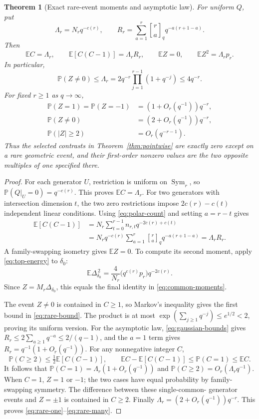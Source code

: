 \documentclass[11pt,a4paper]{article}
\newtheorem{theorem}{Theorem}[section]
\theoremstyle{definition}
\theoremstyle{remark}
\newcommand{\E}{\mathbb E}
\newcommand{\Pp}{\mathbb P}
\newcommand{\Sym}{\operatorname{Sym}}
\newcommand{\gb}[2]{\genfrac{[}{]}{0pt}{}{#1}{#2}_{q}}
\begin{document}
\begin{theorem}[Exact rare-event moments and asymptotic law]
\label{thm:rare-law}
For uniform $Q$, put
\begin{equation}\label{eq:lambda-R}
 \Lambda_r=N_rq^{-c(r)},\qquad
 R_r=\sum_{a=1}^r\gb ra q^{-a(r+1-a)}.
\end{equation}
Then
\begin{equation}\label{eq:common-moments}
 \E C=\Lambda_r,\qquad
 \E[C(C-1)]=\Lambda_r R_r,\qquad
 \E Z=0,\qquad \E Z^2=\Lambda_r p_r.
\end{equation}
In particular,
\begin{equation}\label{eq:rare-bound}
 \Pp(Z\ne0)\le\Lambda_r
 =2q^{-r}\prod_{j=1}^{r-1}(1+q^{-j})\le4q^{-r}.
\end{equation}
For fixed $r\ge1$ as $q\to\infty$,
\begin{align}
 \Pp(Z=1)=\Pp(Z=-1)&=(1+O_r(q^{-1}))q^{-r},
 \label{eq:rare-one}\\
 \Pp(Z\ne0)&=(2+O_r(q^{-1}))q^{-r},
 \label{eq:rare-nonzero}\\
 \Pp(|Z|\ge2)&=O_r(q^{-r-1}).\label{eq:rare-many}
\end{align}
Thus the selected contrasts in Theorem~\ref{thm:pointwise} are exactly
zero except on a rare geometric event, and their first-order nonzero
values are the two opposite multiples of one specified there.
\end{theorem}
\begin{proof}
For each generator $U$, restriction is uniform on $\Sym_r$, so
$\Pp(Q|_U=0)=q^{-c(r)}$. This proves $\E C=\Lambda_r$.
For two generators with intersection dimension $t$, the two zero
restrictions impose $2c(r)-c(t)$ independent linear conditions.
Using \eqref{eq:polar-count} and setting $a=r-t$ gives
\begin{align*}
 \E[C(C-1)]
 &=N_r\sum_{t=0}^{r-1}n_{r,t}q^{-2c(r)+c(t)}\\
 &=N_rq^{-c(r)}\sum_{a=1}^r\gb ra q^{-a(r+1-a)}
 =\Lambda_r R_r.
\end{align*}
A family-swapping isometry gives $\E Z=0$. To compute its second
moment, apply \eqref{eq:top-energy} to $\delta_0$:
\[
 \E\Delta_{\delta_0}^{\,2}
 =\frac4{N_r}\bigl(q^{c(r)}p_r\bigr)q^{-2c(r)}.
\]
Since $Z=M_r\Delta_{\delta_0}$, this equals the final identity in
\eqref{eq:common-moments}.

The event $Z\ne0$ is contained in $C\ge1$, so Markov's inequality gives
the first bound in \eqref{eq:rare-bound}.
The product is at most
$\exp(\sum_{j\ge1}q^{-j})\le e^{1/2}<2$, proving its uniform version.
For the asymptotic law, \eqref{eq:gaussian-bounds} gives
$R_r\le2\sum_{a\ge1}q^{-a}\le2/(q-1)$, and the $a=1$ term gives
$R_r=q^{-1}(1+O_r(q^{-1}))$.
For any nonnegative integer $C$,
\[
 \Pp(C\ge2)\le\tfrac12\E[C(C-1)],\qquad
 \E C-\E[C(C-1)]\le\Pp(C=1)\le\E C.
\]
It follows that
$\Pp(C=1)=\Lambda_r(1+O_r(q^{-1}))$ and
$\Pp(C\ge2)=O_r(\Lambda_r q^{-1})$.
When $C=1$, $Z=1$ or $-1$; the two cases have equal probability by
family-swapping symmetry. The difference between these single-common-
generator events and $Z=\pm1$ is contained in $C\ge2$.
Finally $\Lambda_r=(2+O_r(q^{-1}))q^{-r}$. This proves
\eqref{eq:rare-one}--\eqref{eq:rare-many}.
\end{proof}
\end{document}
